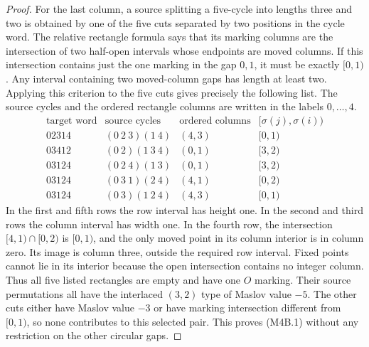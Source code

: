 \documentclass[11pt,oneside]{report}
\theoremstyle{definition}
\numberwithin{equation}{section}
\begin{document}
\begin{proof}
For the last column, a source splitting a five-cycle into lengths three
and two is obtained by one of the five cuts separated by two positions
in the cycle word. The relative rectangle formula says that its marking
columns are the intersection of two half-open intervals whose endpoints
are moved columns. If this intersection contains just the one marking
in the gap $0,1$, it must be exactly $[0,1)$. Any interval containing
two moved-column gaps has length at least two. Applying this criterion
to the five cuts gives precisely the following list. The source cycles
and the ordered rectangle columns are written in the labels $0,\ldots,4$.
\[
\begin{array}{c|c|c|c}
 \text{target word}&\text{source cycles}&
 \text{ordered columns}&[\sigma(j),\sigma(i))\\\hline
 02314&(0\ 2\ 3)(1\ 4)&(4,3)&[0,1)\\
 03412&(0\ 2)(1\ 3\ 4)&(0,1)&[3,2)\\
 03124&(0\ 2\ 4)(1\ 3)&(0,1)&[3,2)\\
 03124&(0\ 3\ 1)(2\ 4)&(4,1)&[0,2)\\
 03124&(0\ 3)(1\ 2\ 4)&(4,3)&[0,1)
\end{array}
\tag{M4B.2}
\]
In the first and fifth rows the row interval has height one. In the
second and third rows the column interval has width one. In the fourth
row, the intersection $[4,1)\cap[0,2)$ is $[0,1)$, and the only
moved point in its column interior is in column zero. Its image is
column three, outside the required row interval. Fixed points cannot
lie in its interior because the open intersection contains no integer
column. Thus all five listed rectangles are empty and have one $O$
marking. Their source permutations all have the interlaced $(3,2)$
type of Maslov value $-5$. The other cuts either have Maslov value
$-3$ or have marking intersection different from $[0,1)$, so none
contributes to this selected pair. This proves (M4B.1) without any
restriction on the other circular gaps.



\end{proof}
\end{document}
